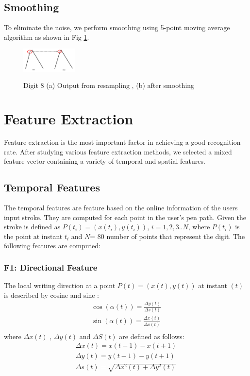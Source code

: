 \documentclass[10pt]{IEEEtran}
\begin{document}
 \subsection{Smoothing}
To eliminate the noise, we perform smoothing using 5-point moving average algorithm \cite{Matlab} as shown in Fig \ref{fig:pre5}.
 \begin{figure}
 \centering
 \includegraphics[width=0.25\textwidth]{pre5}
 \label{fig:pre5}
 \caption{Digit 8 (a)	Output from resampling , (b) after smoothing}
 \end{figure}


\section{Feature Extraction}
\label{sec:FeatureExtraction}
Feature extraction is the most important factor in achieving a good recognition rate. After studying various feature extraction methods, we selected a mixed feature vector containing a variety of temporal and spatial  features.


\subsection{Temporal Features}

The temporal features are feature based on the online information of the users input stroke. They are computed for each point in the user's pen path. Given the stroke is defined as $P(t_i)=(x(t_i),y(t_i))$, $i=1, 2, 3..N$, where  $P(t_i)$ is the  point at instant $t_i$ and  $N$= 80 number of points that represent the digit.  The following features are computed:

\subsubsection{ F1: Directional Feature}
     The local writing direction at a point $P(t)=(x(t),y(t))$ at instant $(t)$ is described by cosine and sine \cite{Jaeger2001}:
\[
\begin{array}{l}
 \cos (\alpha (t)) = \frac{{\Delta y(t)}}{{\Delta s(t)}} \\
 \sin (\alpha (t)) = \frac{{\Delta x(t)}}{{\Delta s(t)}} \\
 \end{array}
\]
where $\Delta x(t)$ , $\Delta y(t)$ and $\Delta S(t)$ are defined as follows:
\[
\begin{array}{l}
 \Delta x(t) = x(t - 1) - x(t + 1) \\
 \Delta y(t) = y(t - 1) - y(t + 1) \\
 \Delta s(t) = \sqrt {\Delta x^2 (t) + \Delta y^2 (t)}  \\
 \end{array}
\]
\end{document}
